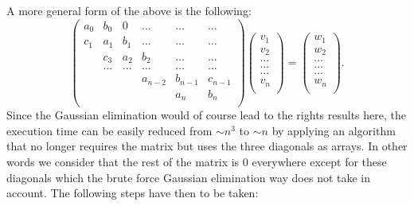 \documentclass[11pt,a4wide]{article}
\begin{document}
A more general form of the above is the following:
\begin{equation}
    \left(\begin{array}{cccccc}
                           a_0& b_0 & 0 &\dots   & \dots &\dots \\
                           c_1 & a_1 & b_1 &\dots &\dots &\dots \\
                           & c_3 & a_2 & b_2 & \dots & \dots \\
                           & \dots   & \dots &\dots   &\dots & \dots \\
                           &   &  &a_{n-2}  &b_{n-1}& c_{n-1} \\
                           &    &  &   &a_n & b_n \\
                      \end{array} \right)\left(\begin{array}{c}
                           v_1\\
                           v_2\\
                           \dots \\
                          \dots  \\
                          \dots \\
                           v_n\\
                      \end{array} \right)
  =\left(\begin{array}{c}
                           w_1\\
                           w_2\\
                           \dots \\
                           \dots \\
                          \dots \\
                           w_n\\
                      \end{array} \right).
											\label{M}
\end{equation}
Since the Gaussian elimination would of course lead to the rights results here, the execution time can be easily reduced from $\sim n^3$ to $\sim n$ by applying an algorithm that no longer requires the matrix but uses the three diagonals as arrays. In other words we consider that the rest of the matrix is 0 everywhere except for these diagonals which the brute force Gaussian elimination way does not take in account. The following steps have then to be taken:
\end{document}
